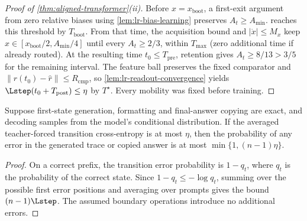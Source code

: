 \begin{proof}[Proof of \cref{thm:aligned-transformer}(ii)]
Before $x=x_{\mathrm{boot}}$, a first-exit argument from zero relative biases
using \cref{lem:lr-bias-learning} preserves $A_t\ge A_{\min}$.
 reaches this threshold by
$T_{\mathrm{boot}}$. From that time, the acquisition bound and $|\dot x|\le M_x$
keep $x\in[x_{\mathrm{boot}}/2,A_{\min}/4]$ until every $A_t\ge2/3$,
within $T_{\max}$ (zero additional time if already routed).
At the resulting time $t_0\le T_{\mathrm{pre}}$, retention gives
$A_t\ge8/13>3/5$ for the remaining interval.
The feature ball preserves the fixed comparator and
$\|r(t_0)-\widehat r\|\le R_{\mathrm{cmp}}$, so
\cref{lem:lr-readout-convergence} yields
$\Lstep(t_0+T_{\mathrm{post}})\le\eta$ by $T^\star$.
Every mobility was fixed before training.
\end{proof}

\begin{corollary}
\label{cor:conditional-rollout}
Suppose first-state generation, formatting and final-answer copying are exact,
and decoding samples from the model's conditional distribution.
If the averaged teacher-forced transition cross-entropy is at most $\eta$,
then the probability of any error in the generated trace or copied answer
is at most $\min\{1,(n-1)\eta\}$.
\end{corollary}
\begin{proof}
On a correct prefix, the transition error probability is $1-q_t$, where
$q_t$ is the probability of the correct state. Since $1-q_t\le-\log q_t$,
summing over the possible first error positions and averaging over prompts
gives the bound $(n-1)\Lstep$. The assumed boundary operations introduce
no additional errors.
\end{proof}
